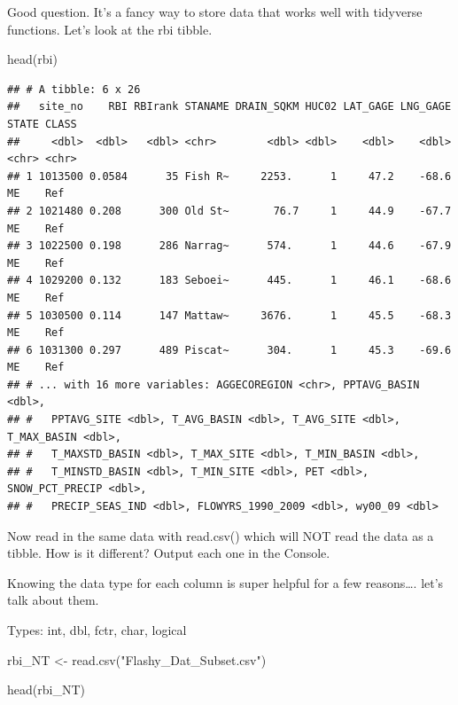 \documentclass[
]{book}
\newenvironment{Shaded}{\begin{snugshade}}{\end{snugshade}}
\newcommand{\FunctionTok}[1]{\textcolor[rgb]{0.00,0.00,0.00}{#1}}
\newcommand{\NormalTok}[1]{#1}
\newcommand{\OtherTok}[1]{\textcolor[rgb]{0.56,0.35,0.01}{#1}}
\newcommand{\StringTok}[1]{\textcolor[rgb]{0.31,0.60,0.02}{#1}}
\begin{document}
Good question. It's a fancy way to store data that works well with tidyverse functions. Let's look at the rbi tibble.

\begin{Shaded}
\begin{Highlighting}[]
\FunctionTok{head}\NormalTok{(rbi)}
\end{Highlighting}
\end{Shaded}

\begin{verbatim}
## # A tibble: 6 x 26
##   site_no    RBI RBIrank STANAME DRAIN_SQKM HUC02 LAT_GAGE LNG_GAGE STATE CLASS
##     <dbl>  <dbl>   <dbl> <chr>        <dbl> <dbl>    <dbl>    <dbl> <chr> <chr>
## 1 1013500 0.0584      35 Fish R~     2253.      1     47.2    -68.6 ME    Ref  
## 2 1021480 0.208      300 Old St~       76.7     1     44.9    -67.7 ME    Ref  
## 3 1022500 0.198      286 Narrag~      574.      1     44.6    -67.9 ME    Ref  
## 4 1029200 0.132      183 Seboei~      445.      1     46.1    -68.6 ME    Ref  
## 5 1030500 0.114      147 Mattaw~     3676.      1     45.5    -68.3 ME    Ref  
## 6 1031300 0.297      489 Piscat~      304.      1     45.3    -69.6 ME    Ref  
## # ... with 16 more variables: AGGECOREGION <chr>, PPTAVG_BASIN <dbl>,
## #   PPTAVG_SITE <dbl>, T_AVG_BASIN <dbl>, T_AVG_SITE <dbl>, T_MAX_BASIN <dbl>,
## #   T_MAXSTD_BASIN <dbl>, T_MAX_SITE <dbl>, T_MIN_BASIN <dbl>,
## #   T_MINSTD_BASIN <dbl>, T_MIN_SITE <dbl>, PET <dbl>, SNOW_PCT_PRECIP <dbl>,
## #   PRECIP_SEAS_IND <dbl>, FLOWYRS_1990_2009 <dbl>, wy00_09 <dbl>
\end{verbatim}

Now read in the same data with read.csv() which will NOT read the data as a tibble. How is it different? Output each one in the Console.

Knowing the data type for each column is super helpful for a few reasons\ldots. let's talk about them.

Types: int, dbl, fctr, char, logical

\begin{Shaded}
\begin{Highlighting}[]
\NormalTok{rbi\_NT }\OtherTok{\textless{}{-}} \FunctionTok{read.csv}\NormalTok{(}\StringTok{"Flashy\_Dat\_Subset.csv"}\NormalTok{)}

\FunctionTok{head}\NormalTok{(rbi\_NT)}
\end{Highlighting}
\end{Shaded}
\end{document}
